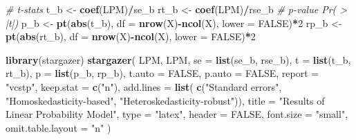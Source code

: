 \documentclass[
  12pt,
]{article}
\newenvironment{Shaded}{\begin{snugshade}}{\end{snugshade}}
\newcommand{\CommentTok}[1]{\textcolor[rgb]{0.56,0.35,0.01}{\textit{#1}}}
\newcommand{\DataTypeTok}[1]{\textcolor[rgb]{0.13,0.29,0.53}{#1}}
\newcommand{\DecValTok}[1]{\textcolor[rgb]{0.00,0.00,0.81}{#1}}
\newcommand{\KeywordTok}[1]{\textcolor[rgb]{0.13,0.29,0.53}{\textbf{#1}}}
\newcommand{\NormalTok}[1]{#1}
\newcommand{\OperatorTok}[1]{\textcolor[rgb]{0.81,0.36,0.00}{\textbf{#1}}}
\newcommand{\OtherTok}[1]{\textcolor[rgb]{0.56,0.35,0.01}{#1}}
\newcommand{\StringTok}[1]{\textcolor[rgb]{0.31,0.60,0.02}{#1}}
\begin{document}
\begin{Shaded}
\begin{Highlighting}[]
\CommentTok{\# t{-}stats}
\NormalTok{t\_b \textless{}{-}}\StringTok{ }\KeywordTok{coef}\NormalTok{(LPM)}\OperatorTok{/}\NormalTok{se\_b }
\NormalTok{rt\_b \textless{}{-}}\StringTok{ }\KeywordTok{coef}\NormalTok{(LPM)}\OperatorTok{/}\NormalTok{rse\_b}
\CommentTok{\# p{-}value Pr( \textgreater{} |t|)}
\NormalTok{p\_b \textless{}{-}}\StringTok{ }\KeywordTok{pt}\NormalTok{(}\KeywordTok{abs}\NormalTok{(t\_b), }\DataTypeTok{df =} \KeywordTok{nrow}\NormalTok{(X)}\OperatorTok{{-}}\KeywordTok{ncol}\NormalTok{(X), }\DataTypeTok{lower =} \OtherTok{FALSE}\NormalTok{)}\OperatorTok{*}\DecValTok{2}
\NormalTok{rp\_b \textless{}{-}}\StringTok{ }\KeywordTok{pt}\NormalTok{(}\KeywordTok{abs}\NormalTok{(rt\_b), }\DataTypeTok{df =} \KeywordTok{nrow}\NormalTok{(X)}\OperatorTok{{-}}\KeywordTok{ncol}\NormalTok{(X), }\DataTypeTok{lower =} \OtherTok{FALSE}\NormalTok{)}\OperatorTok{*}\DecValTok{2}

\KeywordTok{library}\NormalTok{(stargazer)}
\KeywordTok{stargazer}\NormalTok{(}
\NormalTok{  LPM, LPM,}
  \DataTypeTok{se =} \KeywordTok{list}\NormalTok{(se\_b, rse\_b), }\DataTypeTok{t =} \KeywordTok{list}\NormalTok{(t\_b, rt\_b), }\DataTypeTok{p =} \KeywordTok{list}\NormalTok{(p\_b, rp\_b),}
  \DataTypeTok{t.auto =} \OtherTok{FALSE}\NormalTok{, }\DataTypeTok{p.auto =} \OtherTok{FALSE}\NormalTok{,}
  \DataTypeTok{report =} \StringTok{"vcstp"}\NormalTok{, }\DataTypeTok{keep.stat =} \KeywordTok{c}\NormalTok{(}\StringTok{"n"}\NormalTok{),}
  \DataTypeTok{add.lines =} \KeywordTok{list}\NormalTok{(}
    \KeywordTok{c}\NormalTok{(}\StringTok{"Standard errors"}\NormalTok{, }\StringTok{"Homoskedasticity{-}based"}\NormalTok{, }\StringTok{"Heteroskedasticity{-}robust"}\NormalTok{)),}
  \DataTypeTok{title =} \StringTok{"Results of Linear Probability Model"}\NormalTok{,}
  \DataTypeTok{type =} \StringTok{"latex"}\NormalTok{, }\DataTypeTok{header =} \OtherTok{FALSE}\NormalTok{, }\DataTypeTok{font.size =} \StringTok{"small"}\NormalTok{,}
  \DataTypeTok{omit.table.layout =} \StringTok{"n"}
\NormalTok{)}
\end{Highlighting}
\end{Shaded}
\end{document}

